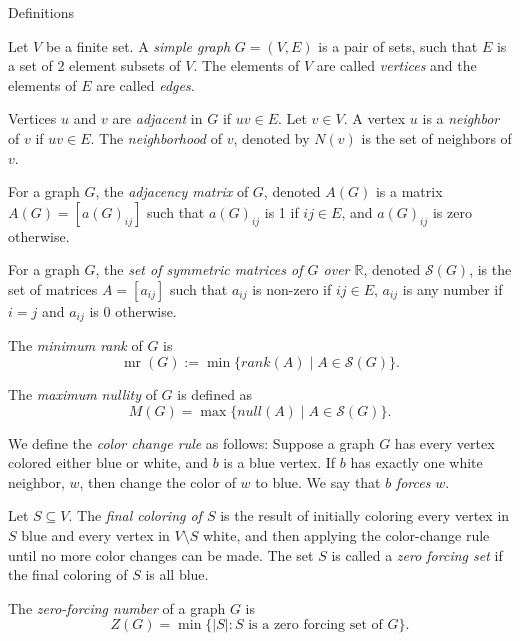 \documentclass[final]{beamer}
\newcommand{\mr}{\operatorname{mr}}
\begin{document}
\begin{frame}{}
\begin{columns}[t]
\begin{column}{0.23\linewidth}
\begin{block} {Definitions}
\item Let $V$ be a finite set. A {\color{blue}\emph{simple graph}} $G=(V,E)$ is a pair of sets, such that $E$ is a set of 2 element subsets of $V$. The elements of $V$ are called {\color{blue}\emph{vertices}} and the elements of $E$ are called {\color{blue}\emph{edges}}. 
\item Vertices $u$ and $v$ are {\color{blue}\emph{adjacent}} in $G$ if $uv \in E$. Let $v \in V$. A vertex $u$ is a {\color{blue}\emph{neighbor}} of $v$ if $uv \in E$. The {\color{blue}\emph{neighborhood}} of $v$, denoted by $N(v)$ is the set of neighbors of $v$.
\item For a graph $G$, the {\color{blue}\emph{adjacency matrix}} of $G$, denoted $A(G)$ is a matrix $A(G) = [a(G)_{ij}]$ such that $a(G)_{ij}$ is 1 if $ij \in E$, and $a(G)_{ij}$ is zero otherwise. 
\item For a graph $G$, the {\color{blue}\emph{set of symmetric matrices of $G$ over $\mathbb{R}$}}, denoted $\mathcal{S}(G)$,  is the set of matrices $A=[a_{ij}]$ such that $a_{ij}$ is non-zero if $ij\in E$, $a_{ij}$ is any number if $i=j$ and $a_{ij}$ is $0$ otherwise. 
\item The {\color{blue}\emph{minimum rank}} of $G$ is 
\[
\mr(G) := \min\{rank(A) \mid A \in \mathcal{S}(G)\}.
\]
\item The {\color{blue}\emph{maximum nullity}} of $G$ is defined as 
\[
M(G) = \max\{null(A) \mid A \in \mathcal{S}(G)\}.
\]
\item We define the {\color{blue}\emph{color change rule}} as follows: Suppose a graph $G$ has every vertex colored either blue or white, and $b$ is a blue vertex. If $b$ has exactly one white neighbor, $w$, then change the color of $w$ to blue. We say that $b$ {\color{blue}\emph{forces }}$w$.
\item Let $S \subseteq V$. The {\color{blue}\emph{final coloring of $S$}} is
	the result of initially coloring every vertex in $S$ blue and every
	vertex in $V \setminus S$ white, and then applying the color-change
	rule until no more color changes can be made. The set $S$ is called a
	{\color{blue}\emph{zero forcing set}} if the final coloring of $S$ is all blue. 
\item The {\color{blue}\emph{zero-forcing number}} of a graph $G$ is 
\[
Z(G) = \min\{|S| : S\text{ is a zero forcing set of }G\}.
\] 


\end{block}
\end{column}
\end{columns}
\end{frame}
\end{document}
